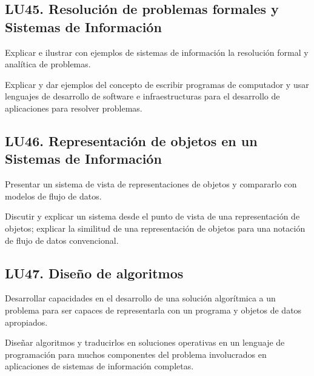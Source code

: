 \subsection{LU45. Resolución de problemas formales y Sistemas de Información}\label{sec:BOK-LU45}\label{sec:LU45}
\begin{LearningUnit}
\begin{LUGoal}
\item Explicar e ilustrar con ejemplos de sistemas de información la resolución formal y analítica de problemas.
\end{LUGoal}

\begin{LUObjective}
\item Explicar y dar ejemplos del concepto de escribir programas de computador y usar lenguajes de desarrollo de software e infraestructuras para el desarrollo de aplicaciones para resolver problemas.
\end{LUObjective}
\end{LearningUnit}

\subsection{LU46. Representación de objetos en un Sistemas de Información}\label{sec:BOK-LU46}\label{sec:LU46}
\begin{LearningUnit}
\begin{LUGoal}
\item Presentar un sistema de vista de representaciones de objetos y compararlo con modelos de flujo de datos.
\end{LUGoal}

\begin{LUObjective}
\item Discutir y explicar un sistema desde el punto de vista de una representación de objetos; explicar la similitud de una representación de objetos para una notación de flujo de datos convencional.
\end{LUObjective}
\end{LearningUnit}

\subsection{LU47. Diseño de algoritmos}\label{sec:BOK-LU47}\label{sec:LU47}
\begin{LearningUnit}
\begin{LUGoal}
\item Desarrollar capacidades en el desarrollo de una solución algorítmica a un problema para ser capaces de representarla con un programa y objetos de datos apropiados.
\end{LUGoal}

\begin{LUObjective}
\item Diseñar algoritmos y traducirlos en soluciones operativas en un lenguaje de programación para muchos componentes del problema involucrados en aplicaciones de sistemas de información completas.
\end{LUObjective}
\end{LearningUnit}

